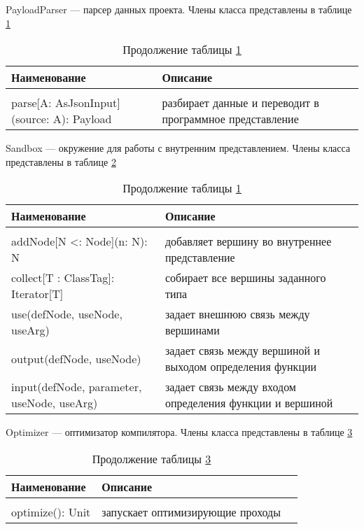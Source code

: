 PayloadParser --- парсер данных проекта. Члены класса представлены в таблице \ref{tab:class21}

\begin{longtable} {| p{8.3cm} | p{8.35cm}l |}
	\caption{Члены класса PayloadParser}
	\label{tab:class21}\\
	\hline
	\centering Наименование &  \centering Описание & \\
	\hline
	\endfirsthead
	\caption*{Продолжение таблицы \ref{tab:class21}}\\
	\hline
	\endhead
	\hline
	\endfoot
	parse[A: AsJsonInput](source: A): Payload & разбирает данные и переводит в программное представление & \\
\end{longtable}

Sandbox --- окружение для работы с внутренним представлением. Члены класса представлены в таблице \ref{tab:class22}

\begin{longtable} {| p{8.3cm} | p{8.35cm}l |}
	\caption{Члены класса Sandbox}
	\label{tab:class22}\\
	\hline
	\centering Наименование &  \centering Описание & \\
	\hline
	\endfirsthead
	\caption*{Продолжение таблицы \ref{tab:class21}}\\
	\hline
	\endhead
	\hline
	\endfoot
	addNode[N <: Node](n: N): N & добавляет вершину во внутреннее представление & \\
	\hline
	collect[T : ClassTag]: Iterator[T] & собирает все вершины заданного типа & \\
	\hline
	use(defNode, useNode, useArg) & задает внешнюю связь между вершинами & \\
	\hline
	output(defNode, useNode) & задает связь между вершиной и выходом определения функции & \\
	\hline
	input(defNode, parameter, useNode, useArg) & задает связь между входом определения функции и вершиной & \\
\end{longtable}

Optimizer --- оптимизатор компилятора. Члены класса представлены в таблице \ref{tab:class23}

\begin{longtable} {| p{8.3cm} | p{8.35cm}l |}
	\caption{Члены класса Optimizer}
	\label{tab:class23}\\
	\hline
	\centering Наименование &  \centering Описание & \\
	\hline
	\endfirsthead
	\caption*{Продолжение таблицы \ref{tab:class23}}\\
	\hline
	\endhead
	\hline
	\endfoot
	optimize(): Unit & запускает оптимизирующие проходы & \\
\end{longtable}


